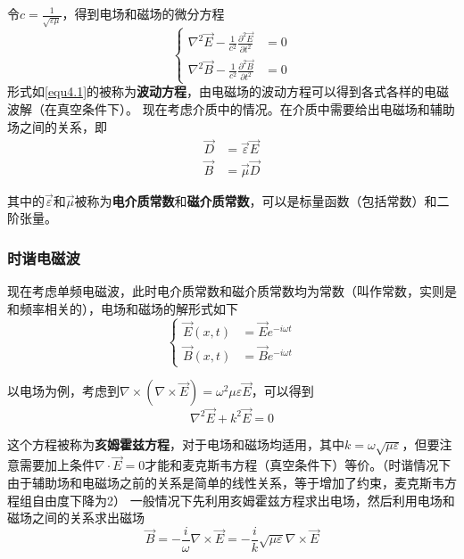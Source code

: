 \documentclass[UTF8]{ctexart}
\begin{document}
    令$c = \frac{1}{\sqrt{\varepsilon \mu}}$，得到电场和磁场的微分方程
    \begin{equation}
        \left\{\begin{aligned}
            \nabla^2 \vec{E} - \frac{1}{c^2} \frac{\partial^2 \vec{E}}{\partial t^2} &=0 \\
            \nabla^2 \vec{B} - \frac{1}{c^2} \frac{\partial^2 \vec{B}}{\partial t^2} &=0
        \end{aligned}\right. \label{equ4.1}
    \end{equation}
\noindent 形式如\autoref{equ4.1}的被称为\textbf{波动方程}，由电磁场的波动方程可以得到各式各样的电磁波解（在真空条件下）。
    现在考虑介质中的情况。在介质中需要给出电磁场和辅助场之间的关系，即
    \begin{equation}
        \begin{aligned}
            \vec{D} &= \vec{\varepsilon} \vec{E} \\
            \vec{B} &= \vec{\mu} \vec{D}
        \end{aligned}
    \end{equation}

\noindent 其中的$\vec{\varepsilon}$和$\vec{\mu}$被称为\textbf{电介质常数}和\textbf{磁介质常数}，可以是标量函数（包括常数）和二阶张量。

    \subsubsection{时谐电磁波}
    现在考虑单频电磁波，此时电介质常数和磁介质常数均为常数（叫作常数，实则是和频率相关的），电场和磁场的解形式如下
    \begin{equation}
        \left \{ \begin{aligned}
            \vec{E}(x,t) &= \vec{E} e^{-i\omega t} \\
            \vec{B}(x,t) &= \vec{B} e^{-i \omega t}
        \end{aligned} \right.
    \end{equation}

\noindent 以电场为例，考虑到$\nabla \times (\nabla \times \vec{E}) = \omega^2 \mu \varepsilon \vec{E}$，可以得到
    \begin{equation}
        \nabla^2 \vec{E} + k^2 \vec{E} = 0
    \end{equation}

\noindent 这个方程被称为\textbf{亥姆霍兹方程}，对于电场和磁场均适用，其中$k = \omega \sqrt{\mu \varepsilon}$，但要注意需要加上条件$\nabla \cdot \vec{E} = 0$才能和麦克斯韦方程（真空条件下）等价。（时谐情况下由于辅助场和电磁场之前的关系是简单的线性关系，等于增加了约束，麦克斯韦方程组自由度下降为2）
    一般情况下先利用亥姆霍兹方程求出电场，然后利用电场和磁场之间的关系求出磁场
    \begin{equation}
        \vec{B} = - \frac{i}{\omega} \nabla \times \vec{E} = - \frac{i}{k} \sqrt{\mu \varepsilon} \nabla \times \vec{E}
    \end{equation}
\end{document}
